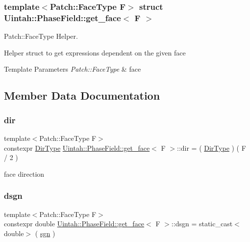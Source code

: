 \subsubsection*{template$<$Patch\+::\+Face\+Type F$>$\newline
struct Uintah\+::\+Phase\+Field\+::get\+\_\+face$<$ F $>$}

Patch\+::\+Face\+Type Helper. 

Helper struct to get expressions dependent on the given face 
\begin{DoxyTemplParams}{Template Parameters}
{\em Patch\+::\+Face\+Type} & face \\
\hline
\end{DoxyTemplParams}


\subsection{Member Data Documentation}
\mbox{\label{structUintah_1_1PhaseField_1_1get__face_ad9ba7a557252042a35b38103270ab337}} 
\subsubsection{\texorpdfstring{dir}{dir}}
{\footnotesize\ttfamily template$<$Patch\+::\+Face\+Type F$>$ \\
constexpr \hyperlink{namespaceUintah_1_1PhaseField_a94555da848596a419ae2c0e32649e1dc}{Dir\+Type} \hyperlink{structUintah_1_1PhaseField_1_1get__face}{Uintah\+::\+Phase\+Field\+::get\+\_\+face}$<$ F $>$\+::dir = ( \hyperlink{namespaceUintah_1_1PhaseField_a94555da848596a419ae2c0e32649e1dc}{Dir\+Type} ) ( F / 2 )\hspace{0.3cm}{\ttfamily [static]}}



face direction 

\mbox{\label{structUintah_1_1PhaseField_1_1get__face_a8a9bcbabfa59c782a7c0ea0d55d85673}} 
\subsubsection{\texorpdfstring{dsgn}{dsgn}}
{\footnotesize\ttfamily template$<$Patch\+::\+Face\+Type F$>$ \\
constexpr double \hyperlink{structUintah_1_1PhaseField_1_1get__face}{Uintah\+::\+Phase\+Field\+::get\+\_\+face}$<$ F $>$\+::dsgn = static\+\_\+cast$<$double$>$ ( \hyperlink{structUintah_1_1PhaseField_1_1get__face_a55e98edca4379a745b28aa34f1d530a2}{sgn} )\hspace{0.3cm}{\ttfamily [static]}}



